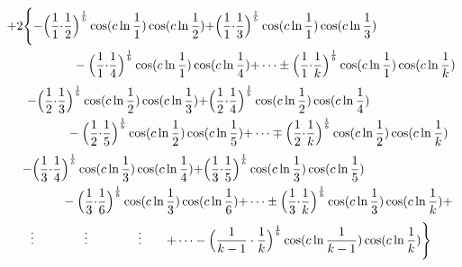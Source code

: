 \documentclass{amsart}
\begin{document}
	\[
	\begin{aligned}
		{+}2\Biggl\{ -\Bigl( \frac{1}{1} {\cdot} \frac{1}{2}& \Bigr)^\frac1b \cos(c \ln \frac{1}{1}) \cos(c \ln \frac{1}{2}) {+} \Bigl( \frac{1}{1} {\cdot} \frac{1}{3} \Bigr)^\frac1b \cos(c \ln \frac{1}{1}) \cos(c \ln \frac{1}{3}) \\ 
		& - \Bigl( \frac{1}{1} {\cdot} \frac{1}{4} \Bigr)^\frac1b \cos(c \ln \frac{1}{1}) \cos(c \ln \frac{1}{4}) {+} \dots \pm \Bigl( \frac{1}{1} {\cdot} \frac{1}{k} \Bigr)^\frac1b \cos(c \ln \frac{1}{1}) \cos(c \ln \frac{1}{k}) \\ 		
	\end{aligned}
	\]
	\[
	\begin{aligned}
		\quad - \Bigl( \frac{1}{2} {\cdot} \frac{1}{3}& \Bigr)^\frac1b \cos(c \ln \frac{1}{2}) \cos(c \ln \frac{1}{3}) {+} \Bigl( \frac{1}{2} {\cdot} \frac{1}{4} \Bigr)^\frac1b \cos(c \ln \frac{1}{2}) \cos(c \ln \frac{1}{4}) \\ 
		& - \Bigl( \frac{1}{2} {\cdot} \frac{1}{5} \Bigr)^\frac1b \cos(c \ln \frac{1}{2}) \cos(c \ln \frac{1}{5}) {+} \dots \mp \Bigl( \frac{1}{2} {\cdot} \frac{1}{k} \Bigr)^\frac1b \cos(c \ln \frac{1}{2}) \cos(c \ln \frac{1}{k}) \\
	\end{aligned}
	\]
	\[
	\begin{aligned}
		\quad - \Bigl( \frac{1}{3} {\cdot} \frac{1}{4}& \Bigr)^\frac1b \cos(c \ln \frac{1}{3}) \cos(c \ln \frac{1}{4}) {+} \Bigl( \frac{1}{3} {\cdot} \frac{1}{5} \Bigr)^\frac1b \cos(c \ln \frac{1}{3}) \cos(c \ln \frac{1}{5}) \\
		& - \Bigl( \frac{1}{3} {\cdot} \frac{1}{6} \Bigr)^\frac1b \cos(c \ln \frac{1}{3}) \cos(c \ln \frac{1}{6}) {+} \dots \pm \Bigl( \frac{1}{3} {\cdot} \frac{1}{k} \Bigr)^\frac1b \cos(c \ln \frac{1}{3}) \cos(c \ln \frac{1}{k}) {+} \\ 		
	\end{aligned}
	\]
	\[
	\begin{aligned}
		\vdots \qquad\qquad \vdots \qquad\qquad \vdots \qquad {+} \dots - \Bigl( \frac{1}{k-1} \cdot \frac{1}{k} \Bigr)^\frac1b \cos(c \ln \frac{1}{k-1}) \cos(c \ln \frac{1}{k}) \Biggr\}
	\end{aligned}
	\]
	
\end{document}
